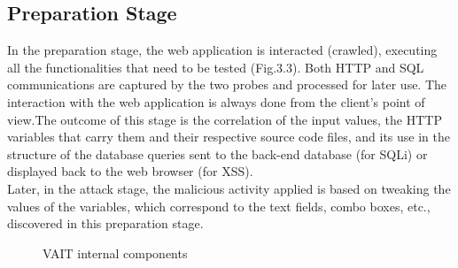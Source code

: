 \subsection{Preparation Stage}
In the preparation stage, the web application is interacted (crawled), executing all the functionalities that need to be tested (Fig.3.3). Both HTTP and SQL communications are captured by the two probes and processed for later use. The interaction with the web application is always done from the client's point of view.The outcome of this stage is the correlation of the input values, the HTTP variables that carry them and their respective source code files, and its use in the structure of the database queries sent to the back-end database (for SQLi) or displayed back to the web browser (for XSS).\\
\newline
Later, in the attack stage, the malicious activity applied is based on tweaking the values of the variables, which correspond to the text fields, combo boxes, etc., discovered in this preparation stage.
\begin{figure}[H]
\captionsetup{width=0.8\textwidth}
\begin{center}
\caption{VAIT internal components}
 \label{fig:1}
\end{center}
\end{figure}

